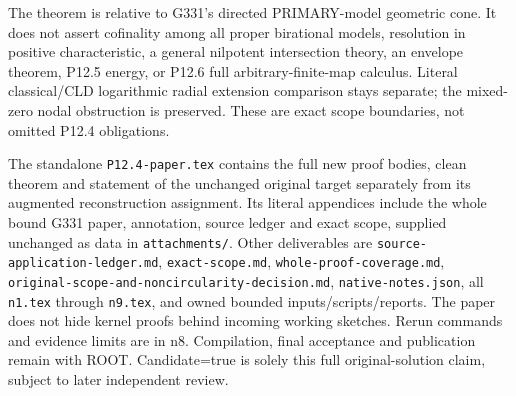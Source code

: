 \documentclass[11pt]{article}
\begin{document}
The theorem is relative to G331's directed PRIMARY-model geometric cone. It does not assert cofinality among all proper birational models, resolution in positive characteristic, a general nilpotent intersection theory, an envelope theorem, P12.5 energy, or P12.6 full arbitrary-finite-map calculus. Literal classical/CLD logarithmic radial extension comparison stays separate; the mixed-zero nodal obstruction is preserved. These are exact scope boundaries, not omitted P12.4 obligations.

The standalone \texttt{P12.4-paper.tex} contains the full new proof bodies, clean theorem and statement of the unchanged original target separately from its augmented reconstruction assignment. Its literal appendices include the whole bound G331 paper, annotation, source ledger and exact scope, supplied unchanged as data in \texttt{attachments/}. Other deliverables are \texttt{source-application-ledger.md}, \texttt{exact-scope.md}, \texttt{whole-proof-coverage.md}, \texttt{original-scope-and-noncircularity-decision.md}, \texttt{native-notes.json}, all \texttt{n1.tex} through \texttt{n9.tex}, and owned bounded inputs/scripts/reports. The paper does not hide kernel proofs behind incoming working sketches. Rerun commands and evidence limits are in n8. Compilation, final acceptance and publication remain with ROOT. Candidate=true is solely this full original-solution claim, subject to later independent review.

\appendix
\end{document}
